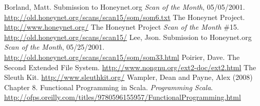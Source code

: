 \documentclass[nocopyrightspace]{sigplanconf}
\begin{document}
\begin{thebibliography}{}
\softraggedright

  Borland, Matt. Submission to Honeynet.org \emph{Scan of the Month},
  05/05/2001. \url{http://old.honeynet.org/scans/scan15/som/som6.txt}
  The Honeynet Project. \url{http://www.honeynet.org/}
  The Honeynet Project \emph{Scan of the Month} \#15.
  \url{http://old.honeynet.org/scans/scan15/}
  Lee, Json. Submission to Honeynet.org \emph{Scan of the Month}, 05/25/2001.
  \url{http://old.honeynet.org/scans/scan15/som/som33.html}
  Poirier, Dave. The Second Extended File System.
  \url{http://www.nongnu.org/ext2-doc/ext2.html}
  The Sleuth Kit. \url{http://www.sleuthkit.org/}
  Wampler, Dean and Payne, Alex (2008) Chapter 8. Functional Programming in
  Scala. {\em Programming Scala}. 
  \url{http://ofps.oreilly.com/titles/9780596155957/FunctionalProgramming.html}

\end{thebibliography}
\end{document}
